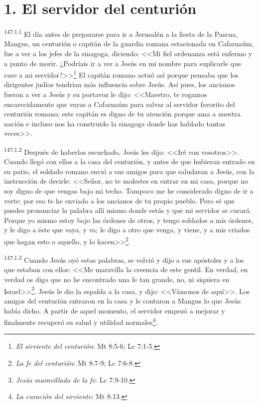 \section*{1. El servidor del centurión}
\par 
\textsuperscript{147:1.1} El día antes de prepararse para ir a Jerusalén a la fiesta de la Pascua, Mangus, un centurión o capitán de la guardia romana estacionada en Cafarnaúm, fue a ver a los jefes de la sinagoga, diciendo: <<Mi fiel ordenanza está enfermo y a punto de morir. ¿Podríais ir a ver a Jesús en mi nombre para suplicarle que cure a mi servidor?>>\footnote{\textit{El sirviente del centurión}: Mt 8:5-6; Lc 7:1-5.} El capitán romano actuó así porque pensaba que los dirigentes judíos tendrían más influencia sobre Jesús. Así pues, los ancianos fueron a ver a Jesús y su portavoz le dijo: <<Maestro, te rogamos encarecidamente que vayas a Cafarnaúm para salvar al servidor favorito del centurión romano; este capitán es digno de tu atención porque ama a nuestra nación e incluso nos ha construido la sinagoga donde has hablado tantas veces>>.

\par 
\textsuperscript{147:1.2} Después de haberlos escuchado, Jesús les dijo: <<Iré con vosotros>>. Cuando llegó con ellos a la casa del centurión, y antes de que hubieran entrado en su patio, el soldado romano envió a sus amigos para que saludaran a Jesús, con la instrucción de decirle: <<Señor, no te molestes en entrar en mi casa, porque no soy digno de que vengas bajo mi techo. Tampoco me he considerado digno de ir a verte; por eso te he enviado a los ancianos de tu propio pueblo. Pero sé que puedes pronunciar la palabra allí mismo donde estás y que mi servidor se curará. Porque yo mismo estoy bajo las órdenes de otros, y tengo soldados a mis órdenes, y le digo a éste que vaya, y va; le digo a otro que venga, y viene, y a mis criados que hagan esto o aquello, y lo hacen>>\footnote{\textit{La fe del centurión}: Mt 8:7-9; Lc 7:6-8.}.

\par 
\textsuperscript{147:1.3} Cuando Jesús oyó estas palabras, se volvió y dijo a sus apóstoles y a los que estaban con ellos: <<Me maravilla la creencia de este gentil. En verdad, en verdad os digo que no he encontrado una fe tan grande, no, ni siquiera en Israel>>\footnote{\textit{Jesús maravillado de la fe}: Lc 7:9-10.}. Jesús le dio la espalda a la casa, y dijo: <<Vámonos de aquí>>. Los amigos del centurión entraron en la casa y le contaron a Mangus lo que Jesús había dicho. A partir de aquel momento, el servidor empezó a mejorar y finalmente recuperó su salud y utilidad normales\footnote{\textit{La curación del sirviente}: Mt 8:13.}.

